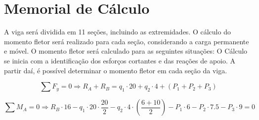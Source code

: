 \section{Memorial de Cálculo}
A viga será dividida em 11 seções, incluindo as extremidades. O cálculo do momento fletor será realizado para cada seção, considerando a carga permanente e móvel. O momento fletor será calculado para as seguintes situações:
O Cálculo se inicia com a identificação dos esforços cortantes e das reações de apoio. A partir daí, é possível determinar o momento fletor em cada seção da viga.

\begin{equation}
    \sum F_y = 0 \Rightarrow R_A + R_B = q_1 \cdot 20 + q_2 \cdot 4 + (P_1 + P_2 + P_3)
\end{equation}

\begin{equation}
    \sum M_A = 0 \Rightarrow R_B \cdot 16 - q_1 \cdot 20 \cdot \frac{20}{2} - q_2 \cdot 4 \cdot \left(\frac{6+10}{2}\right) - P_1 \cdot 6 - P_2 \cdot 7.5 - P_3 \cdot 9 = 0
\end{equation}


